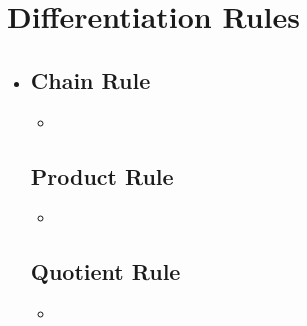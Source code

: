 \section{Differentiation Rules}
\begin{itemize}
  \item []
  
  \subsection{Chain Rule}
  \begin{itemize}
    \item 
  \end{itemize}
  
  \subsection{Product Rule}
  \begin{itemize}
    \item 
  \end{itemize}

  \subsection{Quotient Rule}
  \begin{itemize}
    \item 
  \end{itemize}
  
\end{itemize}

